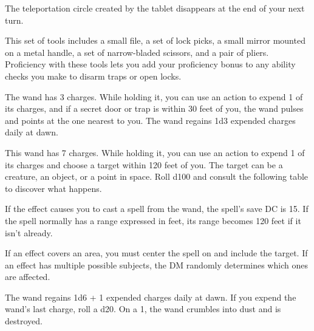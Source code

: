 \documentclass[10pt,a4paper,twoside,fancy,bg=print,twocolumn,openany,nodeprecatedcode]{dndbook}
\begin{document}
The teleportation circle created by the tablet disappears at the end of your next turn.

This set of tools includes a small file, a set of lock picks, a small mirror mounted on a metal handle, a set of narrow-bladed scissors, and a pair of pliers. Proficiency with these tools lets you add your proficiency bonus to any ability checks you make to disarm traps or open locks.

The wand has 3 charges. While holding it, you can use an action to expend 1 of its charges, and if a secret door or trap is within 30 feet of you, the wand pulses and points at the one nearest to you. The wand regains 1d3 expended charges daily at dawn.

This wand has 7 charges. While holding it, you can use an action to expend 1 of its charges and choose a target within 120 feet of you. The target can be a creature, an object, or a point in space. Roll d100 and consult the following table to discover what happens.

If the effect causes you to cast a spell from the wand, the spell's save DC is 15. If the spell normally has a range expressed in feet, its range becomes 120 feet if it isn't already.

If an effect covers an area, you must center the spell on and include the target. If an effect has multiple possible subjects, the DM randomly determines which ones are affected.

The wand regains 1d6 + 1 expended charges daily at dawn. If you expend the wand's last charge, roll a d20. On a 1, the wand crumbles into dust and is destroyed.
\end{document}
